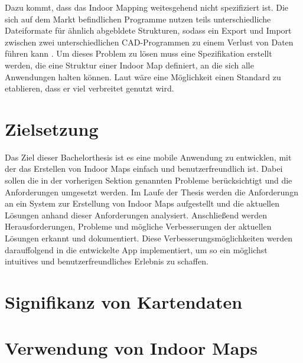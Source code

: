 Dazu kommt, dass das Indoor Mapping weitesgehend nicht spezifiziert ist. Die sich auf dem Markt befindlichen Programme nutzen teils unterschiedliche Dateiformate für ähnlich abgebldete Strukturen, sodass ein Export und Import zwischen zwei unterschiedlichen CAD-Programmen zu einem Verlust von Daten führen kann \parencite{GEL2019}. Um dieses Problem zu lösen muss eine Spezifikation erstellt werden, die eine Struktur einer Indoor Map definiert, an die sich alle Anwendungen halten können. Laut \cite{GEL2019} wäre eine Möglichkeit einen Standard zu etablieren, dass er viel verbreitet genutzt wird.

\section{Zielsetzung}
Das Ziel dieser Bachelorthesis ist es eine mobile Anwendung zu entwicklen, mit der das Erstellen von Indoor Maps einfach und benutzerfreundlich ist. Dabei sollen die in der vorherigen Sektion genannten Probleme berücksichtigt und die Anforderungen umgesetzt werden. Im Laufe der Thesis werden die Anforderungn an ein System zur Erstellung von Indoor Maps aufgestellt und die aktuellen Lösungen anhand dieser Anforderungen analysiert. Anschließend werden Herausforderungen, Probleme und mögliche Verbesserungen der aktuellen Lösungen erkannt und dokumentiert. Diese Verbesserungsmöglichkeiten werden darauffolgend in die entwickelte App implementiert, um so ein möglichst intuitives und benutzerfreundliches Erlebnis zu schaffen.%
%
\section{Signifikanz von Kartendaten}
%
\section{Verwendung von Indoor Maps}
